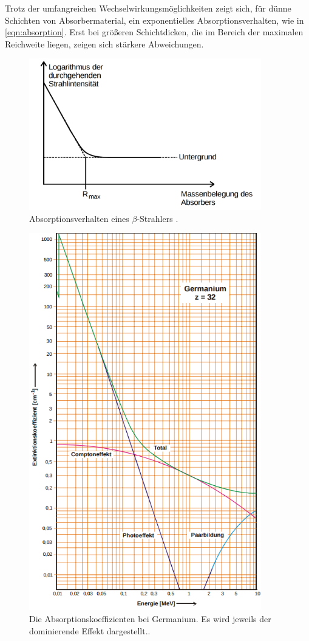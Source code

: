 \documentclass[
  bibliography=totoc,     %
  captions=tableheading,  %
  titlepage=firstiscover, %
]{scrartcl}
\begin{document}
\noindent
Trotz der umfangreichen Wechselwirkungsmöglichkeiten zeigt sich, für dünne Schichten
von Absorbermaterial, ein exponentielles Absorptionsverhalten, wie in \eqref{eqn:absorption}.
Erst bei größeren Schichtdicken, die im Bereich der maximalen Reichweite liegen,
zeigen sich stärkere Abweichungen.
\begin{figure}[htb]
  \centering
  \includegraphics[width=0.9\textwidth]{V7042.png}
  \caption{Absorptionsverhalten eines $\beta$-Strahlers \cite{anleitung}.}
  \label{fig:V7042}
\end{figure}
\begin{figure}[htb]
  \centering
  \includegraphics[width=0.9\textwidth]{V7041.png}
  \caption{Die Absorptionskoeffizienten bei Germanium. Es wird jeweils der dominierende Effekt dargestellt.\cite{anleitung}.}
  \label{fig:V7041}
\end{figure}
\end{document}
